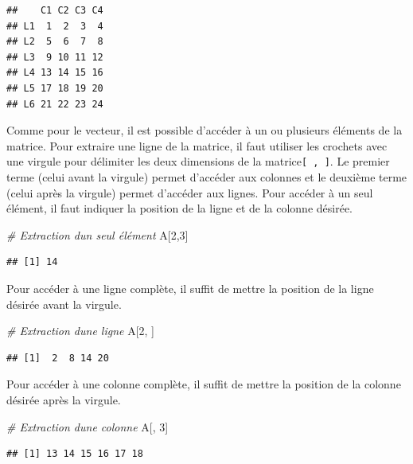 \documentclass[
]{book}
\newenvironment{Shaded}{\begin{snugshade}}{\end{snugshade}}
\newcommand{\CommentTok}[1]{\textcolor[rgb]{0.56,0.35,0.01}{\textit{#1}}}
\newcommand{\DecValTok}[1]{\textcolor[rgb]{0.00,0.00,0.81}{#1}}
\newcommand{\NormalTok}[1]{#1}
\begin{document}
\begin{verbatim}
##    C1 C2 C3 C4
## L1  1  2  3  4
## L2  5  6  7  8
## L3  9 10 11 12
## L4 13 14 15 16
## L5 17 18 19 20
## L6 21 22 23 24
\end{verbatim}

Comme pour le vecteur, il est possible d'accéder à un ou plusieurs éléments de la matrice.
Pour extraire une ligne de la matrice, il faut utiliser les crochets avec une virgule pour délimiter les deux dimensions de la matrice\texttt{{[}\ ,\ {]}}. Le premier terme (celui avant la virgule) permet d'accéder aux colonnes et le deuxième terme (celui après la virgule) permet d'accéder aux lignes.
Pour accéder à un seul élément, il faut indiquer la position de la ligne et de la colonne désirée.

\begin{Shaded}
\begin{Highlighting}[]
\CommentTok{\# Extraction d\textquotesingle{}un seul élément}
\NormalTok{A[}\DecValTok{2}\NormalTok{,}\DecValTok{3}\NormalTok{]}
\end{Highlighting}
\end{Shaded}

\begin{verbatim}
## [1] 14
\end{verbatim}

Pour accéder à une ligne complète, il suffit de mettre la position de la ligne désirée avant la virgule.

\begin{Shaded}
\begin{Highlighting}[]
\CommentTok{\# Extraction d\textquotesingle{}une ligne}
\NormalTok{A[}\DecValTok{2}\NormalTok{, ]}
\end{Highlighting}
\end{Shaded}

\begin{verbatim}
## [1]  2  8 14 20
\end{verbatim}

Pour accéder à une colonne complète, il suffit de mettre la position de la colonne désirée après la virgule.

\begin{Shaded}
\begin{Highlighting}[]
\CommentTok{\# Extraction d\textquotesingle{}une colonne}
\NormalTok{A[, }\DecValTok{3}\NormalTok{]}
\end{Highlighting}
\end{Shaded}

\begin{verbatim}
## [1] 13 14 15 16 17 18
\end{verbatim}
\end{document}
